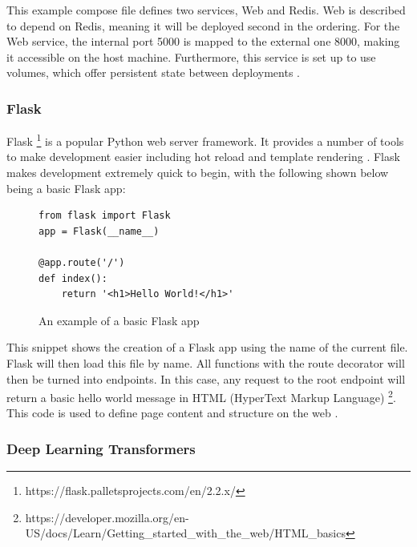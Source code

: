 \documentclass[12pt, letterpaper]{article}
\begin{document}
\begin{flushleft}
This example compose file defines two services, Web and Redis. Web is described to depend on Redis, meaning it will be deployed second in the ordering. For the Web service, the internal port 5000 is mapped to the external one 8000, making it accessible on the host machine. Furthermore, this service is set up to use volumes, which offer persistent state between deployments \cite{docker-compose-example}.
\end{flushleft}

\subsubsection{Flask}\label{sec:flask-desc}

\begin{flushleft}
Flask
\footnote{https://flask.palletsprojects.com/en/2.2.x/}
is a popular Python web server framework. It provides a number of tools to make development easier including hot reload and template rendering \cite{flask}. Flask makes development extremely quick to begin, with the following shown below being a basic Flask app:
\end{flushleft}

\begin{flushleft}
\begin{figure}[H]
\begin{verbatim}
from flask import Flask
app = Flask(__name__)

@app.route('/')
def index():
    return '<h1>Hello World!</h1>' 
\end{verbatim}
\caption{An example of a basic Flask app \cite{flask}}
\end{figure}
\end{flushleft}

\begin{flushleft}
This snippet shows the creation of a Flask app using the name of the current file. Flask will then load this file by name. All functions with the route decorator will then be turned into endpoints. In this case, any request to the root endpoint will return a basic hello world message in HTML (HyperText Markup Language) \footnote{https://developer.mozilla.org/en-US/docs/Learn/Getting\_started\_with\_the\_web/HTML\_basics}. This code is used to define page content and structure on the web \cite{html-desc}.
\end{flushleft}

\subsubsection{Deep Learning Transformers}\label{sec:transformers-desc}
\end{document}
